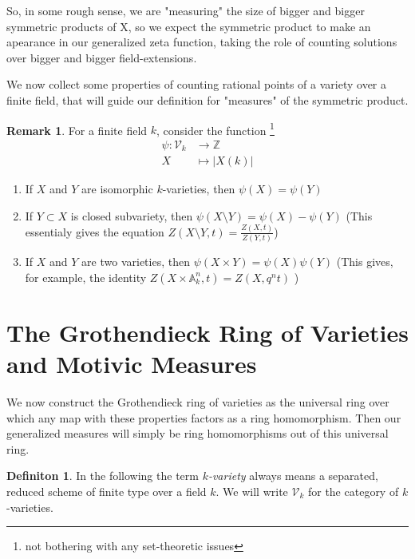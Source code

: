 \documentclass[11pt, a4paper, german]{article}
\theoremstyle{plain}
\theoremstyle{definition}
\newtheorem{definition}[theorem]{Definiton}
\newtheorem{remark}[theorem]{Remark}
\begin{document}
So, in some rough sense, we are "measuring" the size of bigger and bigger symmetric products of X, so we expect the symmetric product
to make an apearance in our generalized zeta function, taking the role of counting solutions over bigger and bigger field-extensions.

We now collect some properties of counting rational points of a variety over a finite field, that will guide our definition for "measures" 
of the symmetric product.

\begin{remark}
    For a finite field $k$, consider the function \footnote{not bothering with any set-theoretic issues} 
    \begin{align*}
        \psi: \mathcal{V}_k & \to   \mathbb{Z}\\
        X & \mapsto |X(k)|
    \end{align*}
    \begin{enumerate}
        \item If $X$ and $Y$ are isomorphic $k$-varieties, then $\psi(X) = \psi(Y)$
        \item If $Y \subset X$ is closed subvariety, then $\psi(X \setminus Y) = \psi(X) - \psi(Y)$ 
              (This essentialy gives the equation $Z(X \setminus Y, t) = \frac{Z(X, t)}{Z(Y,t)}$)
        \item If $X$ and $Y$ are two varieties, then $\psi(X \times Y) = \psi(X)\psi(Y)$
              (This gives, for example, the identity $Z(X \times \mathbb{A}^n_k, t) = Z(X, q^nt)$ )
    \end{enumerate}
\end{remark}


\section{The Grothendieck Ring of Varieties and Motivic Measures}

We now construct the Grothendieck ring of varieties as the universal ring over which any map with these properties factors as a 
ring homomorphism. Then our generalized measures will simply be ring homomorphisms out of this universal ring.

\begin{definition}
    In the following the term \emph{$k$-variety} always means a separated, reduced scheme of finite type over a field $k$.
    We will write $\mathcal{V}_k$ for the category of $k$-varieties.
\end{definition}
\end{document}
